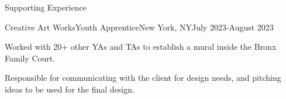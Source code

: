 \documentclass[]{kyvernitis-resume}
\begin{document}
\begin{section}{Supporting Experience}
    \begin{subsection}{Creative Art Works}{Youth Apprentice}{New York, NY}{July 2023-August 2023}
        \item Worked with 20+ other YAs and TAs to establish a mural inside the Bronx Family Court.
        \item Responsible for communicating with the client for design needs, and pitching ideas to be used for the final design.
    \end{subsection}
\end{section}

\end{document}
